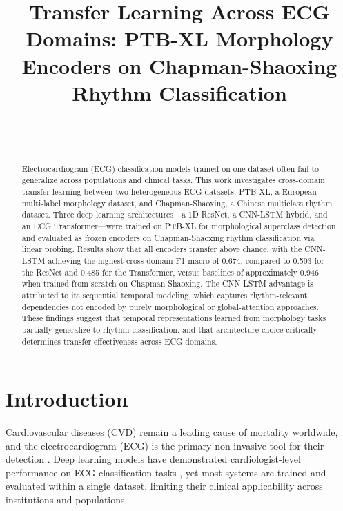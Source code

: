 \documentclass[journal]{IEEEtran}
\begin{document}
\title{Transfer Learning Across ECG Domains: PTB-XL Morphology Encoders on Chapman-Shaoxing Rhythm Classification}

\author{
    \\
    \\
}

\maketitle

\begin{abstract}
Electrocardiogram (ECG) classification models trained on one dataset often fail to generalize across populations and clinical tasks. This work investigates cross-domain transfer learning between two heterogeneous ECG datasets: PTB-XL, a European multi-label morphology dataset, and Chapman-Shaoxing, a Chinese multiclass rhythm dataset. Three deep learning architectures---a 1D ResNet, a CNN-LSTM hybrid, and an ECG Transformer---were trained on PTB-XL for morphological superclass detection and evaluated as frozen encoders on Chapman-Shaoxing rhythm classification via linear probing. Results show that all encoders transfer above chance, with the CNN-LSTM achieving the highest cross-domain F1 macro of 0.674, compared to 0.503 for the ResNet and 0.485 for the Transformer, versus baselines of approximately 0.946 when trained from scratch on Chapman-Shaoxing. The CNN-LSTM advantage is attributed to its sequential temporal modeling, which captures rhythm-relevant dependencies not encoded by purely morphological or global-attention approaches. These findings suggest that temporal representations learned from morphology tasks partially generalize to rhythm classification, and that architecture choice critically determines transfer effectiveness across ECG domains.
\end{abstract}

\section{Introduction}

Cardiovascular diseases (CVD) remain a leading cause of mortality worldwide, and the electrocardiogram (ECG) is the primary non-invasive tool for their detection \cite{who2021cvd}. Deep learning models have demonstrated cardiologist-level performance on ECG classification tasks \cite{hannun2019cardiologist}, yet most systems are trained and evaluated within a single dataset, limiting their clinical applicability across institutions and populations.
\end{document}
